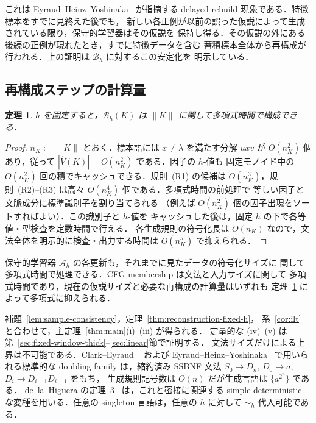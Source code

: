\documentclass[11pt,a4paper]{ltjsarticle}
\newtheorem{theorem}{定理}[section]
\theoremstyle{remark}
\theoremstyle{plain}
\begin{document}
これは Eyraud--Heinz--Yoshinaka~\cite[Appendix]{eyraud-heinz-yoshinaka2016}
が指摘する delayed-rebuild 現象である．特徴標本をすでに見終えた後でも，
新しい各正例が以前の誤った仮説によって生成されている限り，保守的学習器はその仮説を
保持し得る．その仮説の外にある後続の正例が現れたとき，すでに特徴データを含む
蓄積標本全体から再構成が行われる．上の証明は $\mathcal B_h$ に対するこの安定化を
明示している．

\subsection{再構成ステップの計算量}
\label{sec:complexity}

\begin{theorem}\label{thm:poly-build}
$h$ を固定すると，$\mathcal B_h(K)$ は $\|K\|$ に関して多項式時間で構成できる．
\end{theorem}
\begin{proof}
$n_K:=\|K\|$ とおく．標本語には $x\ne\lambda$ を満たす分解 $uxv$ が
$O(n_K^2)$ 個あり，従って $|\widehat V(K)|=O(n_K^2)$ である．因子の $h$-値も
固定モノイド中の $O(n_K^2)$ 回の積でキャッシュできる．規則~(R1) の候補は
$O(n_K^3)$，規則~(R2)--(R3) は高々 $O(n_K^4)$ 個である．多項式時間の前処理で
等しい因子と文脈成分に標準識別子を割り当てられる
（例えば $O(n_K^2)$ 個の因子出現をソートすればよい）．この識別子と $h$-値を
キャッシュした後は，固定 $h$ の下で各等値・型検査を定数時間で行える．
各生成規則の符号化長は $O(n_K)$ なので，文法全体を明示的に検査・出力する時間は
$O(n_K^5)$ で抑えられる．
\end{proof}

保守的学習器 $\mathcal A_h$ の各更新も，それまでに見たデータの符号化サイズに
関して多項式時間で処理できる．CFG membership は文法と入力サイズに関して
多項式時間であり，現在の仮説サイズと必要な再構成の計算量はいずれも
定理~\ref{thm:poly-build} によって多項式に抑えられる．

補題~\ref{lem:sample-consistency}，定理~\ref{thm:reconstruction-fixed-h}，
系~\ref{cor:ilt} と合わせて，主定理~\ref{thm:main}(i)--(iii) が得られる．
定量的な (iv)--(v) は第~\ref{sec:fixed-window-thick}--\ref{sec:linear}節で証明する．
文法サイズだけによる上界は不可能である．Clark--Eyraud
~\cite[Example~2]{clark-eyraud2007} および
Eyraud--Heinz--Yoshinaka~\cite[Example~2.3]{eyraud-heinz-yoshinaka2016}
で用いられる標準的な doubling family は，縮約済み SSBNF 文法
$S_0\to D_n$, $D_0\to a$, $D_i\to D_{i-1}D_{i-1}$ をもち，
生成規則記号数は $O(n)$ だが生成言語は $\{a^{2^n}\}$ である．
de~la~Higuera の定理~3~\cite{higuera1997} は，これと密接に関連する
simple-deterministic な変種を用いる．任意の singleton 言語は，任意の $h$ に対して
$\sim_h$-代入可能である．
\end{document}
